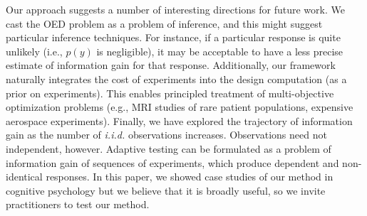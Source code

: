 \documentclass{article}
\begin{document}
Our approach suggests a number of interesting directions for future work.
We cast the OED problem as a problem of inference, and this might suggest particular inference techniques.
For instance, if a particular response is quite unlikely (i.e., $p(y)$ is negligible), it may be acceptable to have a less precise estimate of information gain for that response.
Additionally, our framework naturally integrates the cost of experiments into the design computation (as a prior on experiments).
This enables principled treatment of multi-objective optimization problems (e.g., MRI studies of rare patient populations, expensive aerospace experiments).
Finally, we have explored the trajectory of information gain as the number of \emph{i.i.d.} observations increases.
Observations need not independent, however.
Adaptive testing can be formulated as a problem of information gain of sequences of experiments, which produce dependent and non-identical responses.
In this paper, we showed case studies of our method in cognitive psychology but we believe that it is broadly useful, so we invite practitioners to test our method.



\end{document}
